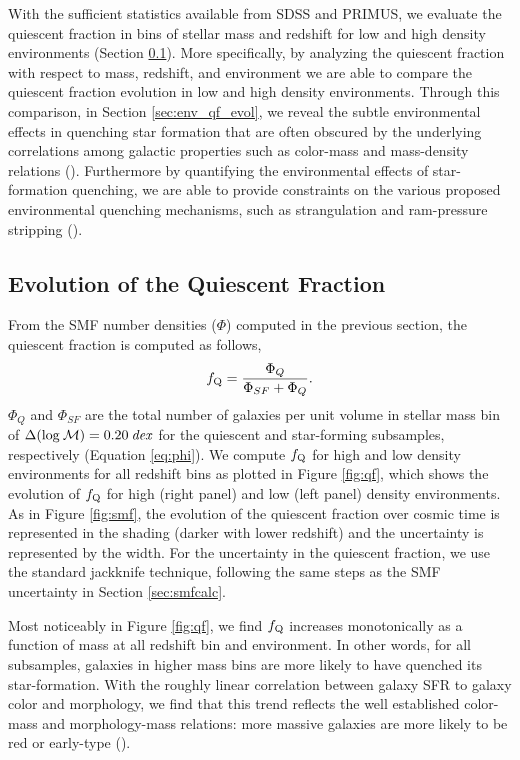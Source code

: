 \documentclass{emulateapj}
\begin{document}
With the sufficient statistics available from SDSS and PRIMUS, we evaluate the quiescent fraction in bins of stellar mass and redshift for low and high density environments (Section \ref{sec:qfevol}). More specifically, by analyzing the quiescent fraction with respect to mass, redshift, and environment we are able to compare the quiescent fraction evolution in low and high density environments. Through this comparison, in Section \ref{sec:env_qf_evol}, we reveal the subtle environmental effects in quenching star formation that are often obscured by the underlying correlations among galactic properties such as color-mass and mass-density relations (\cite{Cooper:2010aa}). Furthermore by quantifying the environmental effects of star-formation quenching, we are able to provide constraints on the various proposed environmental quenching mechanisms, such as strangulation and ram-pressure stripping (\cite{McCarthy:2008aa}).
\subsection{Evolution of the Quiescent Fraction} \label{sec:qfevol}
From the SMF number densities ($\Phi$) computed in the previous section, the quiescent fraction is computed as follows, 
\begin{equation}
f_{\rm{Q}} = \frac{\Phi_{Q}}{\Phi_{SF}+\Phi_{Q}}.
\end{equation}
$\Phi_{Q}$ and $\Phi_{SF}$ are the total number of galaxies per unit volume in stellar mass bin of $\Delta(\rm{log} \: \mathcal{M}) = 0.20 \: {\it dex}$ for the quiescent and star-forming subsamples, respectively (Equation \ref{eq:phi}). We compute $f_{\rm{Q}}$ for high and low density environments for all redshift bins as plotted in Figure \ref{fig:qf}, which shows the evolution of $f_{\rm{Q}}$ for high (right panel) and low (left panel) density environments. As in Figure \ref{fig:smf}, the evolution of the quiescent fraction over cosmic time is represented in the shading (darker with lower redshift) and the uncertainty is represented by the width. For the uncertainty in the quiescent fraction, we use the standard jackknife technique, following the same steps as the SMF uncertainty in Section \ref{sec:smfcalc}. 

Most noticeably in Figure \ref{fig:qf}, we find $f_{\rm{Q}}$ increases monotonically as a function of mass at all redshift bin and environment. In other words, for all subsamples, galaxies in higher mass bins are more likely to have quenched its star-formation. With the roughly linear correlation between galaxy SFR to galaxy color and morphology, we find that this trend reflects the well established color-mass and morphology-mass relations: more massive galaxies are more likely to be red or early-type (\cite{blanton09a}). 
\end{document}
